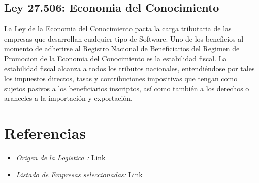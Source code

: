 \documentclass[
10pt, %
a4paper, %
oneside, %
headinclude,footinclude, %
BCOR5mm, %
]{scrartcl}
\begin{document}
  \subsection{Ley 27.506: Economia del Conocimiento}
  \begin{flushleft}
  La Ley de la Economia del Conocimiento pacta la carga tributaria
  de las empresas que desarrollan cualquier tipo de Software.
  \newline \newline
  Uno de los beneficios al momento de adherirse al Registro Nacional de
  Beneficiarios del Regimen de Promocion de la Economia del Conocimiento es
  la estabilidad fiscal.
  \newline \newline
  La estabilidad fiscal alcanza a todos los tributos nacionales, entendiéndose
  por tales los impuestos directos, tasas y contribuciones impositivas que tengan
  como sujetos pasivos a los beneficiarios inscriptos, así como también a los
  derechos o aranceles a la importación y exportación.
  \end{flushleft}


\section{Referencias}

\begin{itemize}
  \item \textit{Origen de la Logistica :} \href{https://clusterlogistic.org/es/historia-de-la-logistica/} {Link}
  \item \textit{Listado de Empresas seleccionadas:} \href{https://servicios.transporte.gob.ar/gobierno_abierto/detalle.php?t=empresas&d=nacional} {Link}
\end{itemize}
\end{document}
